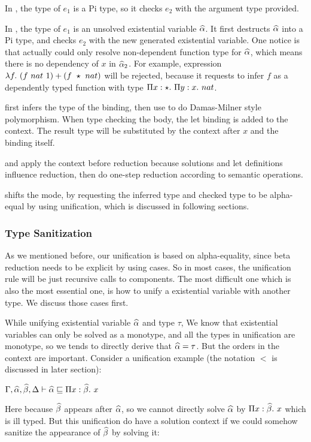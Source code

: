 In , the type of $e_1$ is a Pi type, so it checks $e_2$ with the argument type provided.

In , the type of $e_1$ is an unsolved existential variable $\widehat{\alpha}$. It first destructs $\widehat{\alpha}$ into a Pi type, and checks $e_2$ with the new generated existential variable. One notice is that  actually could only resolve non-dependent function type for $\widehat{\alpha}$, which means there is no dependency of $x$ in $\widehat{\alpha}_2$. For example, expression $\lambda {f}.~ {(f~nat~1) + (f~\star~nat)}$ will be rejected, because it requests to infer $f$ as a dependently typed function with type $\Pi x:\star.~ {\Pi y:x.~} nat$.

 first infers the type of the binding, then use  to do Damas-Milner style polymorphism. When type checking the body, the let binding is added to the context. The result type will be substituted by the context after $x$ and the binding itself.

 and  apply the context before reduction because solutions and let definitions influence reduction, then do one-step reduction according to semantic operations.

 shifts the mode, by requesting the inferred type and checked type to be alpha-equal by using unification, which is discussed in following sections.

\subsubsection{Type Sanitization}

As we mentioned before, our unification is based on alpha-equality, since beta reduction needs to be explicit by using cases. So in most cases, the unification rule will be just recursive calls to components. The most difficult one which is also the most essential one, is how to unify a existential variable with another type. We discuss those cases first.

While unifying existential variable $\widehat{\alpha}$ and type $\tau$, We know that existential variables can only be solved as a monotype, and all the types in unification are monotype, so we tends to directly derive that $\widehat{\alpha} = \tau$. But the orders in the context are important. Consider a unification example (the notation $\lt$ is discussed in later section):

$\Gamma, \widehat{\alpha}, \widehat{\beta}, \Delta \vdash \widehat{\alpha} \sqsubseteq \Pi x:\widehat{\beta}.~ x$

Here because $\widehat{\beta}$ appears after $\widehat{\alpha}$, so we cannot directly solve $\widehat{\alpha}$ by $\Pi x:\widehat{\beta}.~ x$ which is ill typed. But this unification do have a solution context if we could somehow sanitize the appearance of $\widehat{\beta}$ by solving it:

